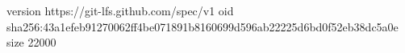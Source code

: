 version https://git-lfs.github.com/spec/v1
oid sha256:43a1efeb91270062ff4be071891b8160699d596ab22225d6bd0f52eb38dc5a0e
size 22000
